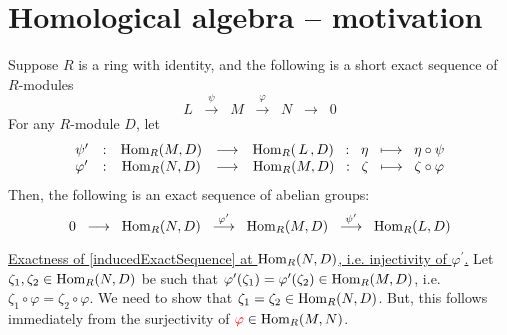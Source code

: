 

\section{Homological algebra -- motivation}
\setcounter{theorem}{0}
\setcounter{equation}{0}


\renewcommand{\theenumi}{\roman{enumi}}
\renewcommand{\labelenumi}{\textnormal{(\theenumi)}$\;\;$}


\begin{proposition}
\label{homologicalAlgebraMotivation}
\mbox{}
\vskip 0.1cm
\noindent
Suppose $R$ is a ring with identity, and the following is
a short exact sequence of $R$-modules
\begin{equation}\label{givenShortExactSequence}
	L
\;\; \overset{\psi}{\longrightarrow} \;\;
	M
\;\; \overset{\varphi}{\longrightarrow} \;\;
	N
\;\; \longrightarrow \;\;
	0
\end{equation}
For any $R$-module $D$, let 
\begin{equation*}
\begin{array}{lccccc}
\psi^{\prime} & : & \textnormal{Hom}_{R}(M,D) & \longrightarrow & \textnormal{Hom}_{R}(\,L\,,D) \;\; : \;\; \eta \;\; \longmapsto \;\; \eta \circ \psi
\\
\varphi^{\prime} & : & \textnormal{Hom}_{R}(N,D) & \longrightarrow & \textnormal{Hom}_{R}(M,D) \;\; : \;\; \zeta \;\; \longmapsto \;\; \zeta \circ \varphi
\end{array}
\end{equation*}
Then, the following is an exact sequence of abelian groups:
\begin{equation}\label{inducedExactSequence}
0
\;\; \longrightarrow \;\;
	\textnormal{Hom}_{R}(N,D)
\;\; \overset{\varphi^{\prime}}{\longrightarrow} \;\;
	\textnormal{Hom}_{R}(M,D)
\;\; \overset{\psi^{\prime}}{\longrightarrow} \;\;
	\textnormal{Hom}_{R}(L,D)
\end{equation}
\end{proposition}
\proof

\vskip 0.25cm
\noindent
\underline{Exactness of \eqref{inducedExactSequence} at $\textnormal{Hom}_{R}(N,D)$, i.e. {\color{red}injectivity of $\varphi^{\prime}$}{\color{white}.}}
\vskip 0.25cm
\noindent
Let $\zeta_{1}, \zeta_{2} \in \textnormal{Hom}_{R}(N,D)$ be such that
$\varphi^{\prime}(\zeta_{1}) = \varphi^{\prime}(\zeta_{2}) \in \textnormal{Hom}_{R}(M,D)$, i.e.
$\zeta_{1} \circ \varphi = \zeta_{2} \circ \varphi$.
We need to show that $\zeta_{1} = \zeta_{2} \in \textnormal{Hom}_{R}(N,D)$.
But, this follows immediately from the {\color{red}surjectivity of} ${\color{red}\varphi} \in \textnormal{Hom}_{R}(M,N)$.


